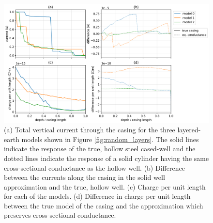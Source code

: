 \begin{figure}
    \begin{center}
    \includegraphics[width=\textwidth]{figures/dc_casing/approximating_wells_currents_charges_random.png}
    \end{center}
\caption{
    (a) Total vertical current through the casing for the three layered-earth models shown in
    Figure \ref{fig:random_layers}. The solid lines indicate the response of the true, hollow steel cased-well
    and the dotted lines indicate the response of a solid cylinder having the same cross-sectional conductance
    as the hollow well. (b) Difference between the currents along the casing in the solid well approximation
    and the true, hollow well.
    (c) Charge per unit length for each of the models. (d) Difference in charge per unit length between the
    true model of the casing and the approximation which preserves cross-sectional conductance.
}
\label{fig:approximating_wells_currents_charges_random}
\end{figure}
